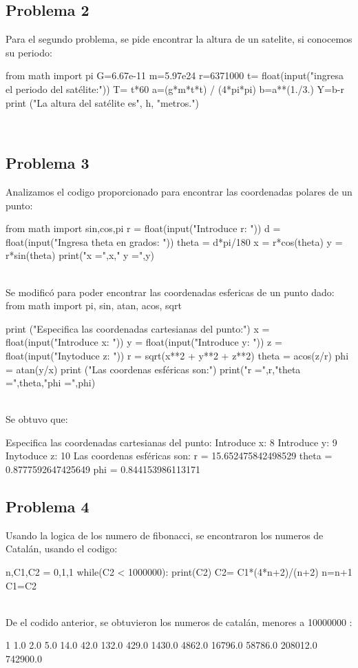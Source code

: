 \documentclass[12pt]{article}
\begin{document}
\subsection{Problema 2}
Para el segundo problema, se pide encontrar la altura de un satelite, si conocemos su periodo: \\
\begin{boxedverbatim}
from math import pi
G=6.67e-11
m=5.97e24
r=6371000
t= float(input("ingresa el periodo del satélite:"))
T= t*60
a=(g*m*t*t) / (4*pi*pi)
b=a**(1./3.)
Y=b-r
print ("La altura del satélite es", h, "metros.")
\end{boxedverbatim}
\\
\pagebreak
\subsection{Problema 3}
Analizamos el codigo proporcionado para encontrar las coordenadas polares de un punto: \\
\begin{boxedverbatim}
from math import sin,cos,pi
r = float(input("Introduce r: "))
d = float(input("Ingresa theta en grados: "))
theta = d*pi/180
x = r*cos(theta)
y = r*sin(theta)
print("x =",x," y =",y) 
\end{boxedverbatim}
  \\
 Se modificó para poder encontrar las coordenadas esfericas de un punto dado:
 from math import pi, sin, atan, acos, sqrt \\
 \begin{boxedverbatim}
print ("Especifica las coordenadas cartesianas del punto:")
x = float(input("Introduce x: "))
y = float(input("Introduce y: "))
z = float(input("Inytoduce z: "))
r = sqrt(x**2 + y**2 + z**2)
theta = acos(z/r)
phi = atan(y/x)
print ("Las coordenas esféricas son:")
print("r =",r,"theta =",theta,"phi =",phi)
\end{boxedverbatim}
\\
Se obtuvo que:\\
\begin{boxedverbatim}
Especifica las coordenadas cartesianas del punto:
Introduce x: 8
Introduce y: 9
Inytoduce z: 10
Las coordenas esféricas son:
r = 15.652475842498529 theta = 0.8777592647425649 phi = 0.844153986113171
\end{boxedverbatim}
\pagebreak
\subsection{Problema 4}
Usando la logica de los numero de fibonacci, se encontraron los numeros de Catalán, usando el codigo: \\
\begin{boxedverbatim}
n,C1,C2 = 0,1,1
while(C2 < 1000000): 
    print(C2)
    C2= C1*(4*n+2)/(n+2)
    n=n+1
    C1=C2
 \end{boxedverbatim}
 \\
 De el codido anterior, se obtuvieron los numeros de catalán, menores a 10000000 :
  \\
 \begin{boxedverbatim}
 1
1.0
2.0
5.0
14.0
42.0
132.0
429.0
1430.0
4862.0
16796.0
58786.0
208012.0
742900.0
 \end{boxedverbatim}
\end{document}
